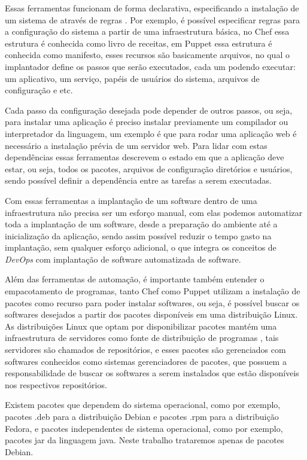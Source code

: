 Essas ferramentas funcionam de forma declarativa, especificando a instalação de um sistema de
através de regras \cite{6265084}. Por exemplo, é possível especificar regras para a configuração do sistema
a partir de uma infraestrutura básica, no Chef essa estrutura é conhecida como livro
de receitas, em Puppet essa estrutura é conhecida como manifesto, esses recursos
são basicamente arquivos, no qual o implantador define os passos que serão executados,
cada um podendo executar: um aplicativo, um serviço, papéis de usuários do sistema,
arquivos de configuração e etc.

Cada passo da configuração desejada pode depender de outros passos, ou seja, para
instalar uma aplicação é preciso instalar previamente um compilador ou interpretador da linguagem,
um exemplo é que para rodar uma aplicação web é necessário a instalação prévia de
um servidor web. Para lidar com estas dependências essas ferramentas descrevem o estado em que a aplicação
deve estar, ou seja, todos os pacotes, arquivos de configuração diretórios e usuários,
sendo possível definir a dependência entre as tarefas a serem executadas.

Com essas ferramentas a implantação de um software dentro de uma infraestrutura
não precisa ser um esforço manual, com elas podemos automatizar toda a implantação
de um software, desde a preparação do ambiente até a inicialização da aplicação,
sendo assim possível reduzir o tempo gasto na implantação, sem qualquer esforço
adicional, o que integra os conceitos de \textit{DevOps} com implantação de software automatizada
de software.

Além das ferramentas de automação, é importante também entender o empacotamento de
programas, tanto Chef como Puppet utilizam a instalação de pacotes como recurso para
poder instalar softwares, ou seja, é possível buscar os softwares desejados a partir
dos pacotes disponíveis em uma distribuição Linux. As distribuições Linux que
optam por disponibilizar pacotes mantém uma infraestrutura de servidores como fonte
de distribuição de programas \cite{araujo2011apprecommender}, tais servidores são
chamados de repositórios, e esses pacotes são gerenciados com softwares conhecidos
como sistemas gerenciadores de pacotes, que possuem a responsabilidade de buscar
os softwares a serem instalados que estão disponíveis nos respectivos repositórios.

Existem pacotes que dependem do sistema operacional, como por exemplo, pacotes .deb
para a distribuição Debian e pacotes .rpm para a distribuição Fedora, e
pacotes independentes de sistema operacional, como por exemplo, pacotes jar da
linguagem java. Neste trabalho trataremos apenas de pacotes Debian.


